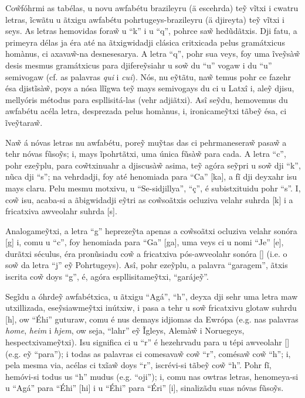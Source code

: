 \documentclass[12pt, a5paper, titlepage]{article}
\begin{document}
\begin{bilingualpages}
    Co\~wfóhrmi as tabélas, u novu awfabétu brazileyru (ä escehrda) te\~y vĩtxi i
    cwatru letras, ĩcwãtu u ãtxigu awfabétu pohrtugeys-brazileyru (ä djireyta)
    te\~y vĩtxi i seys. As letras hemovidas fora\~w u ``k'' i u ``q'', pohrce sa\~w
    hedũdãtxis. Dji fatu, a primeyra délas ja éra até na ãtxigwidadji clásica
    critxicada pelus gramátxicus homànus, ci axava\~w-na desnesesarya. A letra
    ``q'', pohr sua veys, foy uma ĩve\~ysà\~w desis mesmus gramátxicus para
    djifere\~ysiahr u so\~w du ``u'' vogaw i du ``u'' semivogaw (cf. as palavras
    \textit{qui} i \textit{cui}). Nós, nu e\~ytãtu, na\~w temus pohr ce fazehr ésa
    djistĩsà\~w, poys a nósa llĩgwa te\~y mays semivogays du ci u Latxî i, ale\~y
    djisu, mellyóris métodus para espllisitá-las (vehr adjiãtxi). Asî se\~ydu,
    hemovemus du awfabétu acéla letra, desprezada pelus homànus, i, ironicame\~ytxi
    tãbe\~y ésa, ci ĩve\~ytara\~w.

    Na\~w á nóvas letras nu awfabétu, pore\~y mu\~ytas das ci pehrmanesera\~w
    pasa\~w a tehr nóvas fũso\~ys; i, mays ĩpohrtãtxi, uma única fũsà\~w para cada.
    A letra ``c'', pohr eze\~yplu, para co\~wtxinuahr a djiscusà\~w asima, te\~y
    agóra se\~ypri u so\~w dji ``k'', nũca dji ``s''; na vehrdadji, foy até
    henomiada para ``Ca'' [ka], a fĩ dji deyxahr isu mays claru. Pelu mesmu
    motxivu, u ``Se-sidjillya'', ``ç'', é subistxituidu pohr ``s''. I, co\~w isu,
    acaba-si a ãbigwidadji e\~ytri as co\~wsoãtxis ocluziva velahr suhrda [k] i a
    fricatxiva awveolahr suhrda [s].

    Analogame\~ytxi, a letra ``g'' hepreze\~yta apenas a co\~wsoãtxi ocluziva
    velahr sonóra [g] i, comu u ``c'', foy henomiada para ``Ga'' [ga], uma veys ci
    u nomi ``Je'' [\textyogh e], durãtxi séculus, éra pronũsiadu co\~w a fricatxiva
    pós-awveolahr sonóra [\textyogh] (i.e. o so\~w da letra ``j'' e\~y Pohrtugeys).
    Asî, pohr eze\~yplu, a palavra ``garagem'', ãtxis iscrita co\~w doys ``g'', é,
    agóra espllisitame\~ytxi, ``garáje\~y''.

    Segĩdu a óhrde\~y awfabétxica, u ãtxigu ``Agá'', ``h'', deyxa dji sehr uma
    letra maw utxillizada, ese\~ysiawme\~ytxi inútxiw, i pasa a tehr u so\~w
    fricatxivu glotaw suhrdu [h], ow ``Éhi'' guturaw, comu é nus demays idjiomas da
    Ewrópa (e.g. nas palavras \textit{home}, \textit{heim} i \textit{hjem}, ow
    seja, ``lahr'' e\~y Ĩgleys, Alemà\~w i Noruegeys, hespectxivame\~ytxi). Isu
    significa ci u ``r'' é hezehrvadu para u tépi awveolahr [\textfishhookr] (e.g.
    e\~y ``para''); i todas as palavras ci comesava\~w co\~w ``r'', comésa\~w co\~w
    ``h''; i, pela mesma via, acélas ci txĩa\~w doys ``r'', iscrévi-si tãbe\~y
    co\~w ``h''. Pohr fĩ, hemóvi-si todus us ``h'' mudus (e.g. ``oji''); i, comu
    nas owtras letras, henomeya-si u ``Agá'' para ``Éhi'' [\textepsilon hi] i u
    ``Éhi'' para ``Éri'' [\textepsilon \textfishhookr i], sinalizãdu suas nóvas
    fũso\~ys.


\end{bilingualpages}
\end{document}
